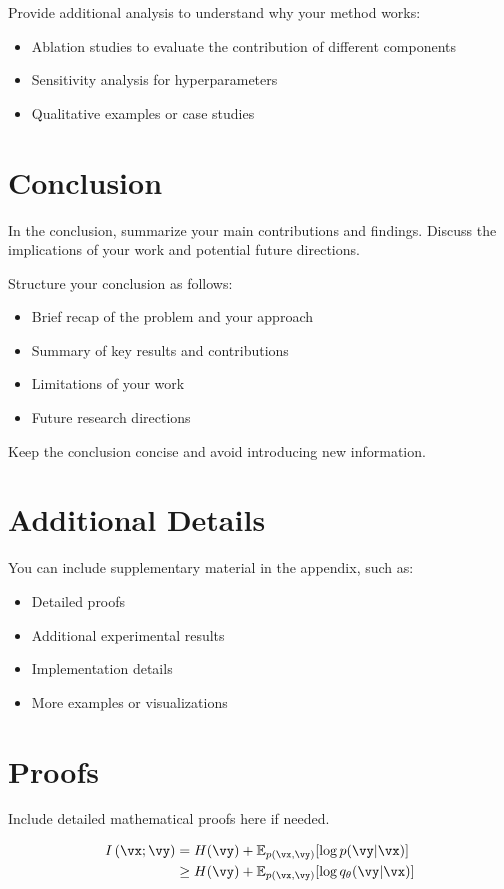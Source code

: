 \documentclass[10pt, a4paper, logo]{googledeepmind}
\def\MI#1#2{{I}\left(#1;#2\right)}
\begin{document}
Provide additional analysis to understand why your method works:
\begin{itemize}
    \item Ablation studies to evaluate the contribution of different components
    \item Sensitivity analysis for hyperparameters
    \item Qualitative examples or case studies
\end{itemize}

\section{Conclusion}
\label{sec:conclusion}

In the conclusion, summarize your main contributions and findings. Discuss the implications of your work and potential future directions.

Structure your conclusion as follows:
\begin{itemize}
    \item Brief recap of the problem and your approach
    \item Summary of key results and contributions
    \item Limitations of your work
    \item Future research directions
\end{itemize}

Keep the conclusion concise and avoid introducing new information.




\appendix
\clearpage

\section{Additional Details}
\label{app:details}

You can include supplementary material in the appendix, such as:
\begin{itemize}
    \item Detailed proofs
    \item Additional experimental results
    \item Implementation details
    \item More examples or visualizations
\end{itemize}

\section{Proofs}
\label{app:proofs}

Include detailed mathematical proofs here if needed.

\begin{align}
\MI{\vx}{\vy} &= H(\vy) + \mathbb{E}_{p(\vx,\vy)} [\log p(\vy|\vx)] \\
&\geq H(\vy) + \mathbb{E}_{p(\vx,\vy)} [\log q_\theta(\vy|\vx)]
\end{align}
\end{document}
